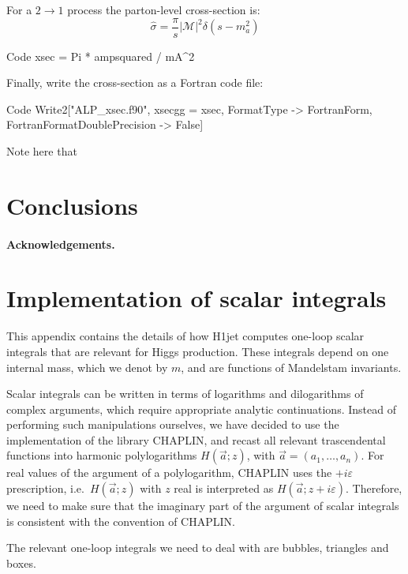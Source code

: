 \documentclass[12pt,a4wide]{article}
\begin{document}
For a $2 \rightarrow 1$ process the parton-level cross-section is: 
\begin{equation}
	\hat{\sigma} = \frac{\pi}{s} \left \vert \mathcal{M} \right \vert^2 \delta \left ( s - m_a^2 \right ) 
\end{equation}
\begin{mmaCell}{Code}
xsec = Pi * ampsquared / mA^2 
\end{mmaCell}
Finally, write the cross-section as a Fortran code file: 
\begin{mmaCell}{Code}
Write2["ALP_xsec.f90", xsecgg = xsec, FormatType -> FortranForm, FortranFormatDoublePrecision -> False] 
\end{mmaCell}
Note here that 


\section{Conclusions}
\label{sec:the-end}

\paragraph{Acknowledgements.}

\appendix

\section{Implementation of scalar integrals}
\label{sec:scalar-integrals}

This appendix contains the details of how H1jet computes one-loop
scalar integrals that are relevant for Higgs production. These
integrals depend on one internal mass, which we denot by $m$, and are
functions of Mandelstam
invariants.

Scalar integrals can be written in terms of logarithms and dilogarithms of complex
arguments, which require appropriate analytic continuations. Instead of performing such manipulations ourselves, we have
decided to use the implementation of the library CHAPLIN, and recast all relevant trascendental
functions into harmonic polylogarithms $H(\vec a;z)$, with
$\vec a=(a_1,\dots,a_n)$. For real values of the argument of a polylogarithm, CHAPLIN
uses the $+i\varepsilon$ prescription, i.e.\ $H(\vec a;z)$ with $z$
real is interpreted as $H(\vec a;z+i\varepsilon)$. Therefore, we need
to make sure that the imaginary part of the argument of scalar
integrals is consistent with the convention of CHAPLIN.

The relevant one-loop integrals we need to deal with are  
bubbles, triangles and boxes.
\end{document}
